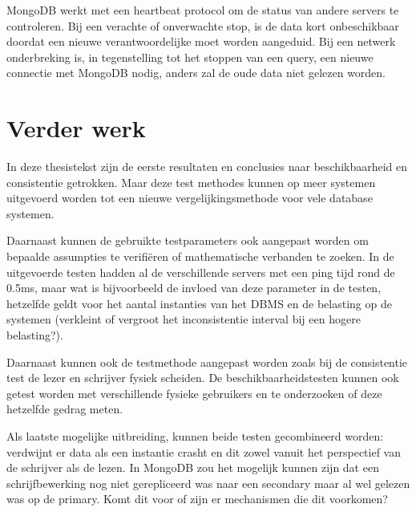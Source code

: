 MongoDB werkt met een heartbeat protocol om de status van andere servers te controleren. Bij een verachte of onverwachte stop, is de data kort onbeschikbaar doordat een nieuwe verantwoordelijke moet worden aangeduid. Bij een netwerk onderbreking is, in tegenstelling tot het stoppen van een query, een nieuwe connectie met MongoDB nodig, anders zal de oude data niet gelezen worden. 

\section{Verder werk}
In deze thesistekst zijn de eerste resultaten en conclusies naar beschikbaarheid en consistentie getrokken. Maar deze test methodes kunnen op meer systemen uitgevoerd worden tot een nieuwe vergelijkingsmethode voor vele database systemen.

Daarnaast kunnen de gebruikte testparameters ook aangepast worden om bepaalde assumpties te verifiëren of mathematische verbanden te zoeken. In de uitgevoerde testen hadden al de verschillende servers met een ping tijd rond de 0.5ms, maar wat is bijvoorbeeld de invloed van deze parameter in de testen, hetzelfde geldt voor het aantal instanties van het DBMS en de belasting op de systemen (verkleint of vergroot het inconsistentie interval bij een hogere belasting?). 

Daarnaast kunnen ook de testmethode aangepast worden zoals bij de consistentie test de lezer en schrijver fysiek scheiden. De beschikbaarheidstesten kunnen ook getest worden met verschillende fysieke gebruikers en te onderzoeken of deze hetzelfde gedrag meten. 

Als laatste mogelijke uitbreiding, kunnen beide testen gecombineerd worden: verdwijnt er data als een instantie crasht en dit zowel vanuit het perspectief van de schrijver als de lezen. In MongoDB zou het mogelijk kunnen zijn dat een schrijfbewerking nog niet gerepliceerd was naar een secondary maar al wel gelezen was op de primary. Komt dit voor of zijn er mechanismen die dit voorkomen?  